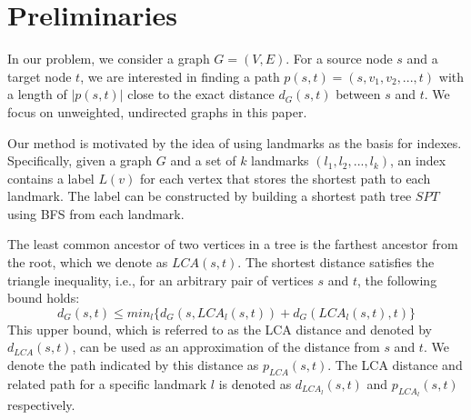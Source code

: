 \section{Preliminaries}
\label{preliminary}

In our problem, we consider a graph $G = (V,E)$. For a source node $s$ and a target node $t$, we are interested in finding a path $p(s,t)=(s,v_1,v_2,...,t)$ with a length of $|p(s,t)|$ close to the exact distance $d_G(s,t)$ between $s$ and $t$. We focus on unweighted, undirected graphs in this paper.

Our method is motivated by the idea of using landmarks as the basis for indexes. Specifically, given a graph $G$ and a set of $k$ landmarks $(l_1,l_2,...,l_k)$, an index contains a label $L(v)$ for each vertex that stores the shortest path to each landmark. The label can be constructed by building a shortest path tree $SPT$ using BFS from each landmark.

The least common ancestor of two vertices in a tree is the farthest ancestor from the root, which we denote as $LCA(s,t)$. The shortest distance satisfies the triangle inequality, i.e., for an arbitrary pair of vertices $s$ and $t$, the following bound holds:
\begin{equation}
\label{equ:upper}
    d_G(s,t) \leq min_{l}\{d_G(s,LCA_{l}(s,t)) + d_G(LCA_{l}(s,t),t)\}
\end{equation}
This upper bound, which is referred to as the LCA distance and denoted by $d_{LCA}(s,t)$, can be used as an approximation of the distance from $s$ and $t$. We denote the path indicated by this distance as $p_{LCA}(s,t)$. The LCA distance and related path for a specific landmark $l$ is denoted as $d_{LCA_l}(s,t)$ and $p_{LCA_l}(s,t)$ respectively.